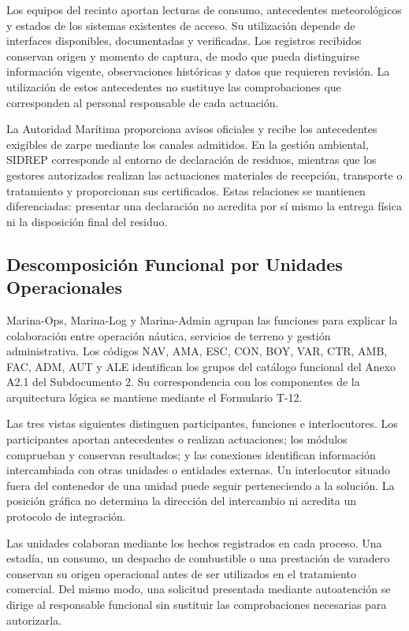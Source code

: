 Los equipos del recinto aportan lecturas de consumo, antecedentes
meteorológicos y estados de los sistemas existentes de acceso. Su
utilización depende de interfaces disponibles, documentadas y verificadas.
Los registros recibidos conservan origen y momento de captura, de modo
que pueda distinguirse información vigente, observaciones históricas y
datos que requieren revisión. La utilización de estos antecedentes no
sustituye las comprobaciones que corresponden al personal responsable
de cada actuación.

La Autoridad Marítima proporciona avisos oficiales y recibe los
antecedentes exigibles de zarpe mediante los canales admitidos. En la
gestión ambiental, SIDREP corresponde al entorno de declaración de
residuos, mientras que los gestores autorizados realizan las actuaciones
materiales de recepción, transporte o tratamiento y proporcionan sus
certificados. Estas relaciones se mantienen diferenciadas: presentar una
declaración no acredita por sí mismo la entrega física ni la disposición
final del residuo.

\subsection{Descomposición Funcional por Unidades Operacionales}

Marina-Ops, Marina-Log y Marina-Admin agrupan las funciones para explicar la colaboración entre operación náutica, servicios de terreno y gestión administrativa. Los códigos NAV, AMA, ESC, CON, BOY, VAR, CTR, AMB, FAC, ADM, AUT y ALE identifican los grupos del catálogo funcional del Anexo A2.1 del Subdocumento 2. Su correspondencia con los componentes de la arquitectura lógica se mantiene mediante el Formulario T-12.

Las tres vistas siguientes distinguen participantes, funciones e interlocutores. Los participantes aportan antecedentes o realizan actuaciones; los módulos comprueban y conservan resultados; y las conexiones identifican información intercambiada con otras unidades o entidades externas. Un interlocutor situado fuera del contenedor de una unidad puede seguir perteneciendo a la solución. La posición gráfica no determina la dirección del intercambio ni acredita un protocolo de integración.

Las unidades colaboran mediante los hechos registrados en cada proceso. Una estadía, un consumo, un despacho de combustible o una prestación de varadero conservan su origen operacional antes de ser utilizados en el tratamiento comercial. Del mismo modo, una solicitud presentada mediante autoatención se dirige al responsable funcional sin sustituir las comprobaciones necesarias para autorizarla.

